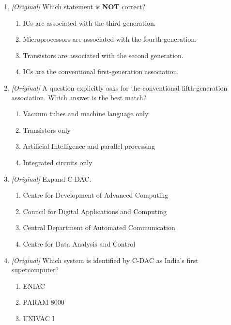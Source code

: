 \begin{enumerate}[label=\textbf{Q\arabic*.}, leftmargin=*]
\begin{enumerate}[label=\Alph*.]
    \item Transistors, vacuum tubes, microprocessors, ICs
    \item ICs, vacuum tubes, transistors, microprocessors
    \item Microprocessors, ICs, transistors, vacuum tubes
  \end{enumerate}
\item \textit{[Original]} Which statement is \textbf{NOT} correct?
  \begin{enumerate}[label=\Alph*.]
    \item ICs are associated with the third generation.
    \item Microprocessors are associated with the fourth generation.
    \item Transistors are associated with the second generation.
    \item ICs are the conventional first-generation association.
  \end{enumerate}
\item \textit{[Original]} A question explicitly asks for the conventional
  fifth-generation association. Which answer is the best match?
  \begin{enumerate}[label=\Alph*.]
    \item Vacuum tubes and machine language only
    \item Transistors only
    \item Artificial Intelligence and parallel processing
    \item Integrated circuits only
  \end{enumerate}
\item \textit{[Original]} Expand C-DAC.
  \begin{enumerate}[label=\Alph*.]
    \item Centre for Development of Advanced Computing
    \item Council for Digital Applications and Computing
    \item Central Department of Automated Communication
    \item Centre for Data Analysis and Control
  \end{enumerate}
\item \textit{[Original]} Which system is identified by C-DAC as India's
  first supercomputer?
  \begin{enumerate}[label=\Alph*.]
    \item ENIAC
    \item PARAM 8000
    \item UNIVAC I

\end{enumerate}
\end{enumerate}
